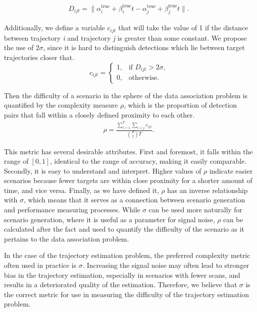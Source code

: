 \begin{align}
D_{ijt} = \| \alpha^{\text{true}}_{i} + \beta^{\text{true}}_{i}t - \alpha^{\text{true}}_{j} + \beta^{\text{true}}_{j}t \|.
\end{align}

Additionally, we define a variable $c_{ijt}$ that will take the value of 1 if the distance between trajectory \textit{i} and trajectory \textit{j} is greater than some constant. We propose the use of $2\sigma$, since it is hard to distinguish detections which lie between target trajectories closer that. 
\[c_{ijt} = 
\begin{cases}
1, & \text{if $D_{ijt} > 2\sigma$,}\\
0, & \text{otherwise.}
\end{cases}\]

Then the difficulty of a scenario in the sphere of the data association problem is quantified by the complexity measure $\rho$, which is the proportion of detection pairs that fall within a closely defined proximity to each other. 
\begin{align}
\rho =  \frac{\sum\limits_{t=1}^{T}\sum\limits_{i<j}c_{ijt}}{\binom{P}{2} T}.
\end{align}

This metric has several desirable attributes. First and foremost, it falls within the range of $[0,1]$, identical to the range of accuracy, making it easily comparable. Secondly, it is easy to understand and interpret. Higher values of $\rho$ indicate easier scenarios because fewer targets are within close proximity for a shorter amount of time, and vice versa. Finally, as we have defined it, $\rho$ has an inverse relationship with $\sigma$, which means that it serves as a connection between scenario generation and performance measuring processes. While $\sigma$ can be used more naturally for scenario generation, where it is useful as a parameter for signal noise, $\rho$ can be calculated after the fact and used to quantify the difficulty of the scenario as it pertains to the data association problem. 

In the case of the trajectory estimation problem, the preferred complexity metric often used in practice is $\sigma$. Increasing the signal noise may often lead to stronger bias in the trajectory estimation, especially in scenarios with fewer scans, and results in a deteriorated quality of the estimation. Therefore, we believe that $\sigma$ is the correct metric for use in measuring the difficulty of the trajectory estimation problem. 

